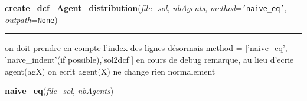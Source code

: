    \label{etude:problems:partitioning:create_dcf_Agent_distribution}

    \vspace{0.5ex}

\hspace{.8\funcindent}\begin{boxedminipage}{\funcwidth}

    \raggedright \textbf{create\_dcf\_Agent\_distribution}(\textit{file\_sol}, \textit{nbAgents}, \textit{method}={\tt \texttt{'}\texttt{naive\_eq}\texttt{'}}, \textit{outpath}={\tt None})

    \vspace{-1.5ex}

    \rule{\textwidth}{0.5\fboxrule}
\setlength{\parskip}{2ex}
    on doit prendre en compte l'index des lignes désormais method = 
    ['naive\_eq', 'naive\_indent'(if possible),'sol2dcf'] en cours de debug
    remarque, au lieu d'ecrie agent(agX) on ecrit agent(X) ne change rien 
    normalement

\setlength{\parskip}{1ex}
    \end{boxedminipage}

    \label{etude:problems:partitioning:naive_eq}

    \vspace{0.5ex}

\hspace{.8\funcindent}\begin{boxedminipage}{\funcwidth}

    \raggedright \textbf{naive\_eq}(\textit{file\_sol}, \textit{nbAgents})

\setlength{\parskip}{2ex}
\setlength{\parskip}{1ex}
    \end{boxedminipage}

    \label{etude:problems:partitioning:create_a_FileSol_wit_a_TPdistribution_for_each_agent}

    \vspace{0.5ex}

